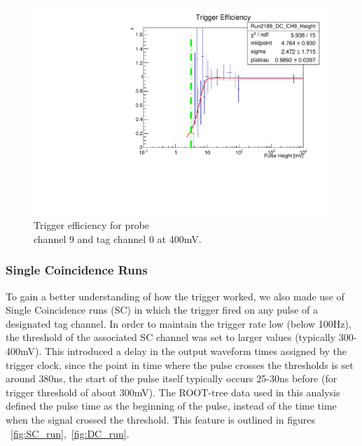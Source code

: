 \documentclass[12pt]{article}
\begin{document}
\begin{figure}[b!]
\centering
\centerline{\includegraphics[scale=0.43]{figures/triggerEfficiency/Efficiency_Run2189_DC_CH9_Height_vs_Run2187_SC_CH9_Height}}
{\caption{ Trigger efficiency for probe \\ channel 9 and tag channel 0 at 400mV. }

\label{fig:rate3}
}
\end{figure}


\subsubsection{Single Coincidence Runs}


To gain a better understanding of how the trigger worked, we also made use of Single Coincidence runs (SC) in which the trigger fired on any pulse of a designated tag channel. In order to maintain the trigger rate low (below 100Hz), the threshold of the associated SC channel was set to larger values (typically 300-400mV). This introduced a delay in the output waveform times assigned by the trigger clock, since the point in time where the pulse crosses the thresholds is set around 380ns, the start of the pulse itself typically occurs 25-30ns before (for trigger threshold of about 300mV). The ROOT-tree data used in this analysis defined the pulse time as the beginning of the pulse, instead of the time time when the signal crossed the threshold. This feature is outlined in figures ~\ref{fig:SC_run},~\ref{fig:DC_run}. \\
\end{document}
